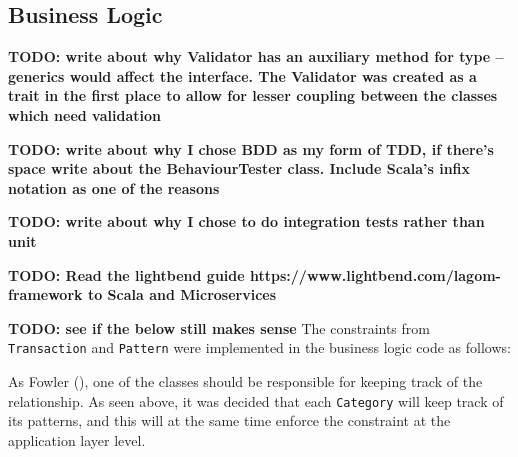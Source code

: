 \subsection{Business Logic} \label{sec:Implementation.BusinessLogic}
\textbf{TODO: write about why Validator has an auxiliary method for type --
generics would affect the interface. The Validator was created as a trait in
the first place to allow for lesser coupling between the classes which need
validation}

\textbf{TODO: write about why I chose BDD as my form of TDD, if there's space
write about the BehaviourTester class. Include Scala's infix notation as one of
the reasons}

\textbf{TODO: write about why I chose to do integration tests rather than unit}

\textbf{TODO: Read the lightbend guide
https://www.lightbend.com/lagom-framework to Scala and Microservices}

\textbf{TODO: see if the below still makes sense}
The constraints from \texttt{Transaction} and \texttt{Pattern} were implemented
in the business logic code as follows:
{
  \small
  
}

{
  \small
  
}

As Fowler (\citeyear[][]{fowler1997analysis}), one of the classes should be
responsible for keeping track of the relationship. As seen above, it was
decided that each \texttt{Category} will keep track of its patterns, and this
will at the same time enforce the constraint at the application layer level.
